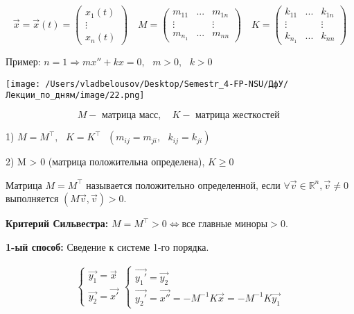 \documentclass[12pt, a4paper]{report}
\begin{document}
\[ \vec{x }  =\vec{x } (t) = \begin{pmatrix}
x_1( t)\\
\vdots\\
x_n (t)
\end{pmatrix} \quad  M =\begin{pmatrix}
m_{11} & ... & m_{1n}\\
\vdots &  & \vdots\\
m_{n_1} & ... & m_{nn} 
\end{pmatrix} \quad K=\begin{pmatrix}
    k_{11} & ... & k_{1n}\\
    \vdots &  & \vdots\\
    k_{n_1} & ... & k_{nn} 
\end{pmatrix}  \]

Пример: \( n =1 \Rightarrow m x'' + kx = 0 , \text{ } m >0 , \text{ } k > 0 \) 

\begin{center}
    \texttt{[image: /Users/vladbelousov/Desktop/Semestr\_4-FP-NSU/ДфУ/Лекции\_по\_дням/image/22.png]}
\end{center}

\[ M -\text{ матрица масс} , \quad  K -\text{ матрица жесткостей } \] 

1) \( M = M^{\top} , \text{ }  K = K^{\top}   \text{ } (m_{ij}= m_{j i} ,\text{ } k_{ij} = k_{j i}   ) \) 

2) M > 0  (матрица положительна определена), \( K \geq 0 \) 

\begin{definition}
    Матрица \( M = M^{\top} \) называется положительно определенной, если \( \forall \vec{v } \in  \mathbb{R} ^{n } , \vec{v } \neq 0  \) выполняется \( (M\vec{v} , \vec{v} ) >0 \).  
\end{definition}

\textbf{Критерий Сильвестра: } \( M = M^{\top} > 0 \Leftrightarrow  \text{все главные миноры} > 0. \)

\textbf{1-ый способ:} Сведение к системе 1-го порядка. 

\[ \begin{aligned}
    \begin{cases}
        \vec{y_1 } = \vec{x } \\
        \vec{y_2 } = \vec{x '} 
    \end{cases}
    \begin{cases}
        \vec{y_1 '} = \vec{y_2} \\
        \vec{y_2  '} = \vec{x ''} = -M ^{-1} K \vec{x }  = - M ^{-1} K \vec{y_1}   
    \end{cases}
\end{aligned} \] 
\end{document}
